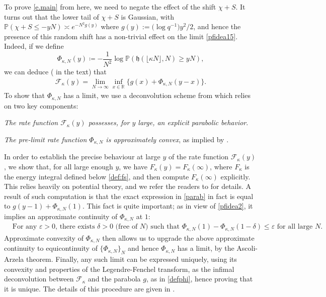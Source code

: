 \documentclass[reqno,11pt]{amsart}
\newcommand{\e}{\varepsilon}
\newcommand{\h}{\mathfrak{h}}
\renewcommand{\Pr}{\mathbb{P}}
\numberwithin{equation}{section}
\theoremstyle{definition}
\newcommand{\R}{\mathbb{R}}
\begin{document}
To prove \eqref{e.main} from here, we need to negate the effect of the shift $\chi+S$. It turns out that the lower tail of $\chi+S$ is Gaussian, with $\Pr(\chi+S \le -yN) \asymp e^{-N^2g(y)}$ where $g(y):=\big(\log q^{-1}\big)y^2/2$, and hence {the presence of this random shift} has a non-trivial effect {on the limit \eqref{pfidea15}}. Indeed, if we define
\begin{equation*}
    \Phi_{\kappa,N}(y) \coloneqq -\frac1{N^2}\log\Pr(\h(\lfloor \kappa N \rfloor,N) \ge yN),
\end{equation*}
we can deduce ( in the text) that
\begin{align}\label{pfidea2}
    \mathcal{F}_\kappa(y) =\lim_{N\to \infty}\inf_{x\in \R} \{g(x)+\Phi_{\kappa,N}(y-x)\}.
\end{align}
To show that $\Phi_{\kappa,N}$ has a limit, we use a deconvolution scheme from \cite{das2023large} which relies on two key components:
\begin{itemize}
\setlength\itemsep{0.2em}
    {
    \item \emph{The rate function $\mathcal{F}_\kappa(y)$ possesses, for $y$ large, an explicit parabolic behavior}.  
    \item \emph{The pre-limit rate function $\Phi_{\kappa,N}$ is approximately convex}, as implied by .
    }
\end{itemize}
{In order to establish the precise behaviour at large $y$ of the rate function $\mathcal{F}_\kappa(y)$, we show that, for all large enough $y$, we have $F_\kappa(y)=F_\kappa(\infty)$, where $F_{\kappa}$ is the energy integral defined below \eqref{def:fs}, and then compute $F_\kappa(\infty)$ explicitly. This relies heavily on potential theory, and we refer the readers to  for details. A result of such computation is that the exact expression in \eqref{parab} in fact is equal to $g(y-1)+\Phi_{\kappa,N}(1)$. This fact is quite important; as in view of \eqref{pfidea2}, it implies an approximate continuity of $\Phi_{\kappa,N}$ at $1$: 
\begin{align*}
    & \mbox{For any $\e>0$, there exists $\delta>0$ (free of $N$) such that } 
\Phi_{\kappa,N}(1)-\Phi_{\kappa,N}(1-\delta) \le \e \mbox{ for all large }N.
\end{align*} 
Approximate convexity of $\Phi_{\kappa,N}$ then allows us to upgrade the above approximate continuity to equicontinuity of $\{\Phi_{\kappa,N}\}_N$ and hence $\Phi_{\kappa,N}$ has a limit{, by the Ascoli-Arzela theorem}. {Finally, any such limit can be expressed uniquely, using its convexity and properties of the Legendre-Fenchel transform, as the infimal deconvolution between $\mathcal{F}_\kappa$ and the parabola $g$, as in \eqref{defphi}, hence proving that it is unique.} The details {of this procedure} are given in .
}
\end{document}
